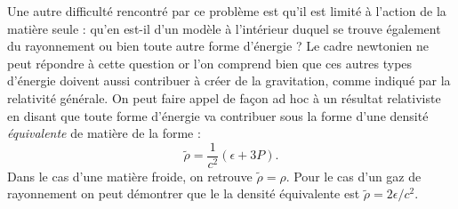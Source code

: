Une autre difficulté rencontré par ce problème est qu'il est limité à l'action de la matière seule : qu'en est-il d'un modèle à l'intérieur duquel se trouve également du rayonnement ou bien toute autre forme d'énergie ? Le cadre newtonien ne peut répondre à cette question or l'on comprend bien que ces autres types d'énergie doivent aussi contribuer à créer de la gravitation, comme indiqué par la relativité générale. On peut faire appel de façon ad hoc à un résultat relativiste en disant que toute forme d'énergie va contribuer sous la forme d'une densité \textit{équivalente} de matière de la forme :
\begin{equation}
\tilde \rho= \frac{1}{c^2}(\epsilon + 3P).
\end{equation}
Dans le cas d'une matière froide, on retrouve $\tilde \rho =\rho$. Pour le cas d'un gaz de rayonnement on peut démontrer que le la densité équivalente est $\tilde \rho =2\epsilon/c^2$.

